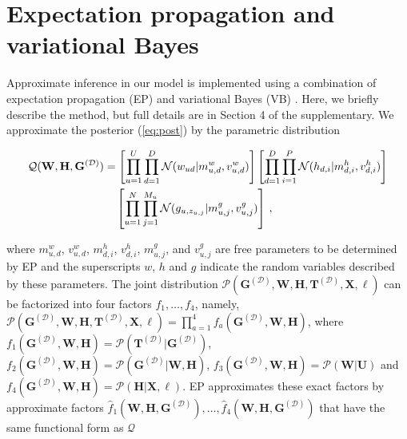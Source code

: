 \section{Expectation propagation and variational Bayes \label{sec:EPinference}}

Approximate inference in our model is implemented using a
combination of expectation propagation (EP) \cite{Minka2002} and variational Bayes (VB) \cite{Ghahramani2001}.
Here, we briefly describe the method, but
full details are in Section 4 of the supplementary.
We approximate the posterior (\ref{eq:post}) by the parametric distribution

\vspace{-0.65cm}
{\small
\begin{align}
\mathcal{Q}(\mathbf{W},\mathbf{H},\mathbf{G}^{(\mathcal{D})}) & =
\left[\prod_{u=1}^{U}\prod_{d=1}^{D}\mathcal{N}(w_{ud}|m_{u,d}^{w},v_{u,d}^{w})\right]
\left[\prod_{d=1}^{D}\prod_{i=1}^{P} \mathcal{N}(h_{d,i}|m_{d,i}^h,v_{d,i}^{h})\right]\notag\\
& \quad
\left[\prod_{u=1}^N \prod_{j=1}^{M_u} \mathcal{N}(g_{u,z_{u,j}}|m_{u,j}^g,v_{u,j}^g)\right]\,,
\end{align}
}

\vspace{-0.5cm}
\normalsize where $m_{u,d}^w$, $v_{u,d}^w$, $m_{d,i}^h$, $v_{d,i}^h$,
$m_{u,j}^g$, and $v_{u,j}^g$ are free parameters to be determined by EP
and the superscripts $w$, $h$ and $g$ indicate the random variables
described by these parameters.
The joint distribution 
$\mathcal{P}(\mathbf{G}^{(\mathcal{D})},\mathbf{W},\mathbf{H},\mathbf{T}^{(\mathcal{D})},\mathbf{X},\ell)$ can be factorized
into four factors $f_1,\ldots,f_4$, namely,
$\mathcal{P}(\mathbf{G}^{(\mathcal{D})},\mathbf{W},\mathbf{H},\mathbf{T}^{(\mathcal{D})},\mathbf{X},\ell) =
\prod_{a=1}^4 f_a(\mathbf{G}^{(\mathcal{D})},\mathbf{W},\mathbf{H})$,
where
$f_1(\mathbf{G}^{(\mathcal{D})},\mathbf{W},\mathbf{H})=\mathcal{P}(\mathbf{T}^{(\mathcal{D})}|\mathbf{G}^{(\mathcal{D})})$,
$f_2(\mathbf{G}^{(\mathcal{D})},\mathbf{W},\mathbf{H})=\mathcal{P}(\mathbf{G}^{(\mathcal{D})}|\mathbf{W},\mathbf{H})$,
$f_3(\mathbf{G}^{(\mathcal{D})},\mathbf{W},\mathbf{H})=\mathcal{P}(\mathbf{W}|\mathbf{U})$ and
$f_4(\mathbf{G}^{(\mathcal{D})},\mathbf{W},\mathbf{H})=\mathcal{P}(\mathbf{H}|\mathbf{X},\ell)$.
EP approximates these exact factors by 
approximate factors $\hat{f}_{1}(\mathbf{W},\mathbf{H},\mathbf{G}^{(\mathcal{D})}),\ldots,\hat{f}_{4}(\mathbf{W},\mathbf{H},\mathbf{G}^{(\mathcal{D})})$
that have the same functional form as $\mathcal{Q}$

